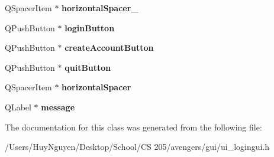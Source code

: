 \begin{DoxyCompactItemize}
\item 
Q\+Spacer\+Item $\ast$ {\bfseries horizontal\+Spacer\+\_}\hypertarget{classUi__LoginGUI_a4ecc1a523fbed3436a30fc13b34b1341}{}\label{classUi__LoginGUI_a4ecc1a523fbed3436a30fc13b34b1341}

\item 
Q\+Push\+Button $\ast$ {\bfseries login\+Button}\hypertarget{classUi__LoginGUI_abec5705499c6621c877a96dac09345fc}{}\label{classUi__LoginGUI_abec5705499c6621c877a96dac09345fc}

\item 
Q\+Push\+Button $\ast$ {\bfseries create\+Account\+Button}\hypertarget{classUi__LoginGUI_ae02506e4ff97f4eb7bcecbdcfa306db0}{}\label{classUi__LoginGUI_ae02506e4ff97f4eb7bcecbdcfa306db0}

\item 
Q\+Push\+Button $\ast$ {\bfseries quit\+Button}\hypertarget{classUi__LoginGUI_affe5fe2705d03d559f2ac2b6dae8eb87}{}\label{classUi__LoginGUI_affe5fe2705d03d559f2ac2b6dae8eb87}

\item 
Q\+Spacer\+Item $\ast$ {\bfseries horizontal\+Spacer}\hypertarget{classUi__LoginGUI_af6869e95e0c803aad0ea8ff372c6296e}{}\label{classUi__LoginGUI_af6869e95e0c803aad0ea8ff372c6296e}

\item 
Q\+Label $\ast$ {\bfseries message}\hypertarget{classUi__LoginGUI_aae7665efd0af07dd1ec8a3a9d4563a19}{}\label{classUi__LoginGUI_aae7665efd0af07dd1ec8a3a9d4563a19}

\end{DoxyCompactItemize}


The documentation for this class was generated from the following file\+:\begin{DoxyCompactItemize}
\item 
/\+Users/\+Huy\+Nguyen/\+Desktop/\+School/\+C\+S 205/avengers/gui/ui\+\_\+logingui.\+h\end{DoxyCompactItemize}
